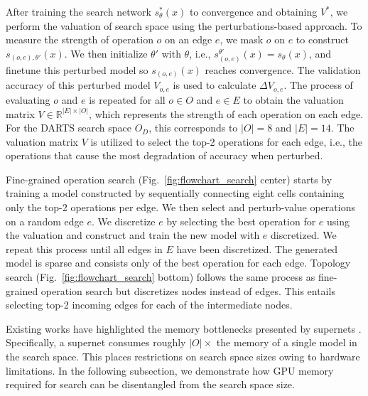 \documentclass[onecolumn]{IEEEtran}
\begin{document}
After training the search network \( s^*_{\theta}(x) \) to convergence and obtaining \( V^* \), we perform the valuation of search space using the perturbations-based approach. To measure the strength of operation \( o \) on an edge \( e \), we mask \( o \) on \( e \) to construct \( s_{(o,e),\theta'}(x) \). We then initialize \( \theta' \) with \( \theta \), i.e., \( s_{(o,e)}^{\theta'}(x) = s_{\theta}(x) \), and finetune this perturbed model so \( s_{(o,e)}(x) \) reaches convergence. The validation accuracy of this perturbed model \( V_{o,e} \) is used to calculate \( \Delta V_{o,e} \). The process of evaluating \( o \) and \( e \) is repeated for all \( o \in O \) and \( e \in E \) to obtain the valuation matrix \( V \in \mathbb{R}^{|E| \times |O|} \), which represents the strength of each operation on each edge. For the DARTS search space \( O_D \), this corresponds to \( |O| = 8 \) and \( |E| = 14 \). The valuation matrix \( V \) is utilized to select the top-2 operations for each edge, i.e., the operations that cause the most degradation of accuracy when perturbed.

Fine-grained operation search (Fig.~\ref{fig:flowchart_search} center) starts by training a model constructed by sequentially connecting eight cells containing only the top-2 operations per edge. We then select and perturb-value operations on a random edge \( e \). We discretize \( e \) by selecting the best operation for \( e \) using the valuation and construct and train the new model with \( e \) discretized. We repeat this process until all edges in \( E \) have been discretized. The generated model is sparse and consists only of the best operation for each edge. Topology search (Fig.~\ref{fig:flowchart_search} bottom) follows the same process as fine-grained operation search but discretizes nodes instead of edges. This entails selecting top-2 incoming edges for each of the intermediate nodes.

Existing works have highlighted the memory bottlenecks presented by supernets \cite{Cai2018, Xu2019}. Specifically, a supernet consumes roughly \( |O| \times \) the memory of a single model in the search space. This places restrictions on search space sizes owing to hardware limitations. In the following subsection, we demonstrate how GPU memory required for search can be disentangled from the search space size.
\end{document}
